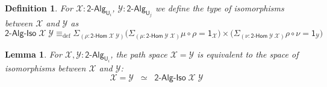 \documentclass[reqno,10pt,a4paper,oneside]{amsart}
\numberwithin{equation}{section}
\theoremstyle{mythm}
\newtheorem{lemma}[theorem]{Lemma}
\theoremstyle{mydef}
\newtheorem{definition}[theorem]{Definition}
\theoremstyle{myrmk}
\newcommand{\deq}{\equiv}
\newcommand{\defeq}{\deq_{\mathrm{def}}}
\newcommand{\comp}{\circ}
\newcommand{\sm}[1]{\Sigma_{#1}}
\newcommand{\one}{\mathsf{1}}
\newcommand{\UU}{\mathsf{U}}
\newcommand{\BoolAlg}{\mathsf{2}\text{-}\mathsf{Alg}}
\newcommand{\BoolHom}{\mathsf{2}\text{-}\mathsf{Hom}}
\newcommand{\BoolAlgIso}{\mathsf{2}\text{-}\mathsf{Alg}\text{-}\mathsf{Iso}}
\newcommand{\X}{\mathcal{X}}
\newcommand{\Y}{\mathcal{Y}}
\begin{document}
\begin{definition}
For $\X : \BoolAlg_{\UU_i}$, $\Y : \BoolAlg_{\UU_j}$ we define the type of \emph{isomorphisms} between $\X$ and $\Y$ as
\[\BoolAlgIso \; \X \; \Y \defeq \sm{(\rho : \BoolHom \; \X \; \Y)} \Big( \sm{(\mu : \BoolHom \; \Y \; \X)} \mu \comp \rho = \one_\X \Big) \times \Big( \sm{(\nu : \BoolHom \; \Y \; \X)} \rho \comp \nu = \one_\Y \Big) \] 
\end{definition}






\begin{lemma}\label{BoolAlgSpace}
For $\X,\Y : \BoolAlg_{\UU_i}$, the path space $\X = \Y$ is equivalent to the space of isomorphisms between $\X$ and $\Y$:
\[ \X = \Y \;\; \simeq \;\; \BoolAlgIso \; \X \; \Y \] 
\end{lemma}
\end{document}
